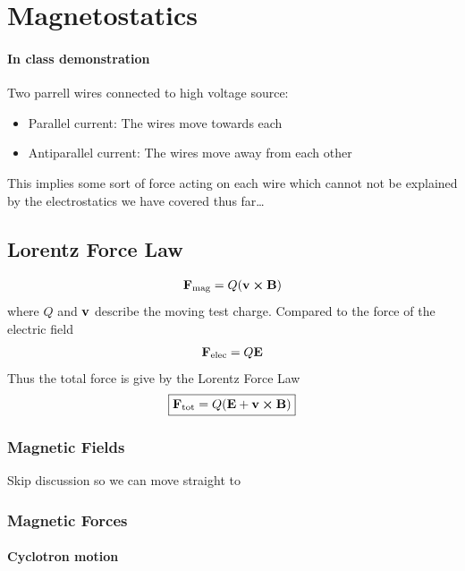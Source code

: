 \documentclass[../main.tex]{subfiles}
\begin{document}
\pagestyle{fancy}

\section{Magnetostatics}
\barh \vspace{1em}

\paragraph{In class demonstration} Two parrell wires connected to high voltage source:
\begin{itemize}
    \item Parallel current: The wires move towards each
    \item Antiparallel current: The wires move away from each other
\end{itemize}
This implies some sort of force acting on each wire which cannot not be explained by the electrostatics we have covered thus far\dots

\subsection{Lorentz Force Law}

\begin{align*}
        \vb F_\text{mag} = Q (\vb v \cross \vb B)
\end{align*}
where $Q$ and $\vb v$ describe the moving test charge.
Compared to the force of the electric field
\begin{align*}
    \vb F_\text{elec} = Q \vb E
\end{align*}
Thus the total force is give by the Lorentz Force Law
\begin{align*}
    \boxed{
        \vb F_\text{tot} = Q(\vb E + \vb v \cross \vb B)
    }
\end{align*}
\subsubsection{Magnetic Fields}

Skip discussion so we can move straight to

\subsubsection{Magnetic Forces}
\paragraph{Cyclotron motion}
\end{document}
